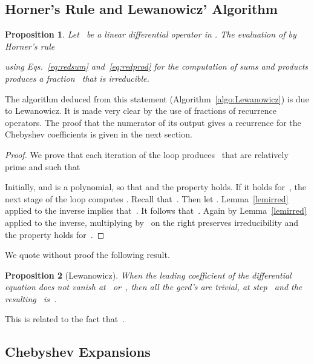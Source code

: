 \documentclass{amsart}
\newtheorem{prop}{Proposition}
\theoremstyle{definition}
\begin{document}
\subsection{Horner's Rule and Lewanowicz' Algorithm}
\begin{prop}\label{horner}
	Let~ be a linear differential operator in . The evaluation of  by Horner's rule
	
using Eqs.~\eqref{eq:redsum} and~\eqref{eq:redprod} for the computation of sums and products produces a fraction~ that is irreducible.
\end{prop}
The algorithm deduced from this statement (Algorithm~\ref{algo:Lewanowicz}) is due to Lewanowicz. It is made very clear by the use of fractions of recurrence operators. The proof that the numerator of its output gives a recurrence for the Chebyshev coefficients is given in the next section.
\begin{proof}
We prove that each iteration of the loop produces~ that are relatively prime and such that 

Initially,  and  is a polynomial, so that  and the property holds.
If it holds for~, the next stage of the loop computes .
Recall that~. Then let . Lemma~\ref{lemirred} applied to the inverse  implies that~. It follows that~. Again by Lemma~\ref{lemirred} applied to the inverse, multiplying by~ on the right preserves irreducibility and the property holds for~.
\end{proof}
We quote without proof the following result.
\begin{prop}[Lewanowicz]\label{prop:Lewanowicz}
When the leading coefficient  of the differential equation does not vanish at~ or~, then all the gcrd's are trivial,  at step~ and the resulting~ is~.
\end{prop}
This is related to the fact that~.
\subsection{Chebyshev Expansions}
\end{document}
